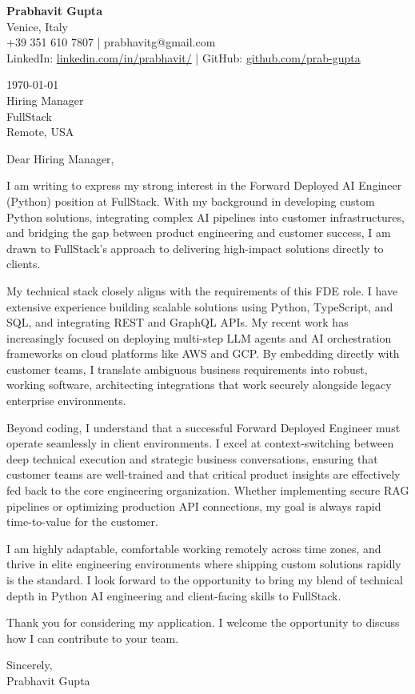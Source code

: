 \documentclass[11pt,a4paper]{article}
\begin{document}
\begin{flushleft}
\textbf{Prabhavit Gupta}\\
Venice, Italy\\
+39 351 610 7807 | prabhavitg@gmail.com\\
LinkedIn: \href{https://www.linkedin.com/in/prabhavit/}{linkedin.com/in/prabhavit/} | GitHub: \href{https://github.com/prab-gupta}{github.com/prab-gupta}
\end{flushleft}

\vspace{1em}

\begin{flushleft}
\today\\
\vspace{1em}
Hiring Manager\\
FullStack\\
Remote, USA
\end{flushleft}

\vspace{1em}

Dear Hiring Manager,

I am writing to express my strong interest in the Forward Deployed AI Engineer (Python) position at FullStack. With my background in developing custom Python solutions, integrating complex AI pipelines into customer infrastructures, and bridging the gap between product engineering and customer success, I am drawn to FullStack's approach to delivering high-impact solutions directly to clients.

My technical stack closely aligns with the requirements of this FDE role. I have extensive experience building scalable solutions using Python, TypeScript, and SQL, and integrating REST and GraphQL APIs. My recent work has increasingly focused on deploying multi-step LLM agents and AI orchestration frameworks on cloud platforms like AWS and GCP. By embedding directly with customer teams, I translate ambiguous business requirements into robust, working software, architecting integrations that work securely alongside legacy enterprise environments.

Beyond coding, I understand that a successful Forward Deployed Engineer must operate seamlessly in client environments. I excel at context-switching between deep technical execution and strategic business conversations, ensuring that customer teams are well-trained and that critical product insights are effectively fed back to the core engineering organization. Whether implementing secure RAG pipelines or optimizing production API connections, my goal is always rapid time-to-value for the customer.

I am highly adaptable, comfortable working remotely across time zones, and thrive in elite engineering environments where shipping custom solutions rapidly is the standard. I look forward to the opportunity to bring my blend of technical depth in Python AI engineering and client-facing skills to FullStack.

Thank you for considering my application. I welcome the opportunity to discuss how I can contribute to your team.

Sincerely,\\
\vspace{1em}
Prabhavit Gupta
\end{document}
